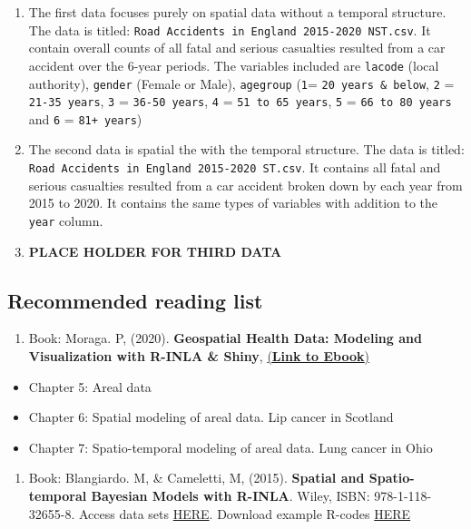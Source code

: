 \documentclass[
]{book}
\providecommand{\tightlist}{%
  \setlength{\itemsep}{0pt}\setlength{\parskip}{0pt}}
\begin{document}
\begin{enumerate}
\def\labelenumi{\arabic{enumi}.}
\item
  The first data focuses purely on spatial data without a temporal structure. The data is titled: \texttt{Road\ Accidents\ in\ England\ 2015-2020\ NST.csv}. It contain overall counts of all fatal and serious casualties resulted from a car accident over the 6-year periods. The variables included are \texttt{lacode} (local authority), \texttt{gender} (Female or Male), \texttt{agegroup} (\texttt{1}= \texttt{20\ years\ \&\ below}, \texttt{2} = \texttt{21-35\ years}, \texttt{3} = \texttt{36-50\ years}, \texttt{4} = \texttt{51\ to\ 65\ years}, \texttt{5} = \texttt{66\ to\ 80\ years} and \texttt{6} = \texttt{81+\ years})
\item
  The second data is spatial the with the temporal structure. The data is titled: \texttt{Road\ Accidents\ in\ England\ 2015-2020\ ST.csv}. It contains all fatal and serious casualties resulted from a car accident broken down by each year from 2015 to 2020. It contains the same types of variables with addition to the \texttt{year} column.
\item
  \textbf{PLACE HOLDER FOR THIRD DATA}
\end{enumerate}

\hypertarget{recommended-reading-list}{%
\subsection{Recommended reading list}\label{recommended-reading-list}}

\begin{enumerate}
\def\labelenumi{\arabic{enumi}.}
\tightlist
\item
  Book: Moraga. P, (2020). \textbf{Geospatial Health Data: Modeling and Visualization with R-INLA \& Shiny}, \href{https://www.paulamoraga.com/book-geospatial/}{(\textbf{Link to Ebook})}
\end{enumerate}

\begin{itemize}
\item
  Chapter 5: Areal data
\item
  Chapter 6: Spatial modeling of areal data. Lip cancer in Scotland
\item
  Chapter 7: Spatio-temporal modeling of areal data. Lung cancer in Ohio
\end{itemize}

\begin{enumerate}
\def\labelenumi{\arabic{enumi}.}
\setcounter{enumi}{1}
\tightlist
\item
  Book: Blangiardo. M, \& Cameletti, M, (2015). \textbf{Spatial and Spatio-temporal Bayesian Models with R-INLA}. Wiley, ISBN: 978-1-118-32655-8. Access data sets \href{https://sites.google.com/a/r-inla.org/stbook/datasets}{HERE}. Download example R-codes \href{https://sites.google.com/a/r-inla.org/stbook/r-code}{HERE}
\end{enumerate}
\end{document}
